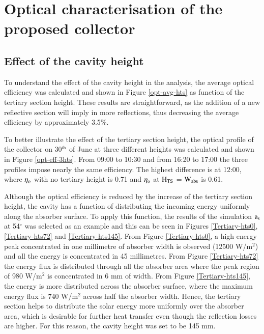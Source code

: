 
\section{Optical characterisation of the proposed collector}

\subsection{Effect of the cavity height}

To understand the effect of the cavity height in the analysis, the average optical efficiency was calculated and shown in Figure \ref{opt-avg-hts} as function of the tertiary section height. These results are straightforward, as the addition of a new reflective section will imply in more reflections, thus decreasing the average efficiency by approximately 3.5\%.


To better illustrate the effect of the tertiary section height, the optical profile of the collector on 30$^{\rm th}$ of June at three different heights was calculated and shown in Figure \ref{opt-eff-3hts}. From 09:00 to 10:30 and from 16:20 to 17:00 the three profiles impose nearly the same efficiency. The highest difference is at 12:00, where $\eta_{\rm{o}}$ with no tertiary height is 0.71 and $\eta_{\rm{o}}$ at $\rm{H_{TS}}$ = $\rm{W_{abs}}$ is 0.61.


Although the optical efficiency is reduced by the increase of the tertiary section height, the cavity has a function of distributing the incoming energy uniformly along the absorber surface. To apply this function, the results of the simulation ${\rm{a_s}}$ at 54$^{\circ}$ was selected as an example and this can be seen in Figures \ref{Tertiary-hts0}, \ref{Tertiary-hts72} and \ref{Tertiary-hts145}. From Figure \ref{Tertiary-hts0}, a high energy peak concentrated in one millimetre of absorber width is observed (12500 W/m$^2$) and all the energy is concentrated in 45 millimetres. From Figure \ref{Tertiary-hts72} the energy flux is distributed through all the absorber area where the peak region of 980 W/m$^2$ is concentrated in 6 mm of width. From Figure \ref{Tertiary-hts145}, the energy is more distributed across the absorber surface, where the maximum energy flux is 740 W/m$^2$ across half the absorber width. Hence, the tertiary section helps to distribute the solar energy more uniformly over the absorber area, which is desirable for further heat transfer even though the reflection losses are higher. For this reason, the cavity height was set to be 145 mm.

